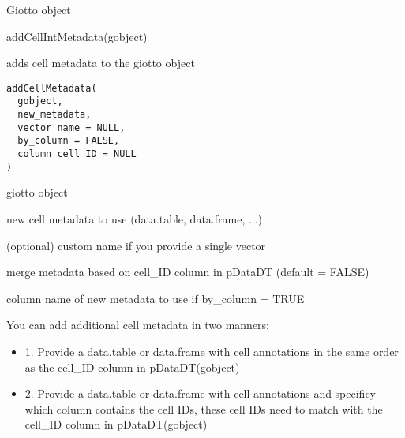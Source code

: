 \documentclass[a4paper]{book}
\begin{document}
%
\begin{Value}
Giotto object
\end{Value}
%
\begin{Examples}
\begin{ExampleCode}
    addCellIntMetadata(gobject)
\end{ExampleCode}
\end{Examples}
%
\begin{Description}\relax
adds cell metadata to the giotto object
\end{Description}
%
\begin{Usage}
\begin{verbatim}
addCellMetadata(
  gobject,
  new_metadata,
  vector_name = NULL,
  by_column = FALSE,
  column_cell_ID = NULL
)
\end{verbatim}
\end{Usage}
%
\begin{Arguments}
\begin{ldescription}
\item[\code{gobject}] giotto object

\item[\code{new\_metadata}] new cell metadata to use (data.table, data.frame, ...)

\item[\code{vector\_name}] (optional) custom name if you provide a single vector

\item[\code{by\_column}] merge metadata based on cell\_ID column in pDataDT (default = FALSE)

\item[\code{column\_cell\_ID}] column name of new metadata to use if by\_column = TRUE
\end{ldescription}
\end{Arguments}
%
\begin{Details}\relax
You can add additional cell metadata in two manners:
\begin{itemize}

\item{} 1. Provide a data.table or data.frame with cell annotations in the same order as the cell\_ID column in pDataDT(gobject) 
\item{} 2. Provide a data.table or data.frame with cell annotations and specificy which column contains the cell IDs, these cell IDs need to match with the cell\_ID column in pDataDT(gobject)

\end{itemize}

\end{Details}
\end{document}
